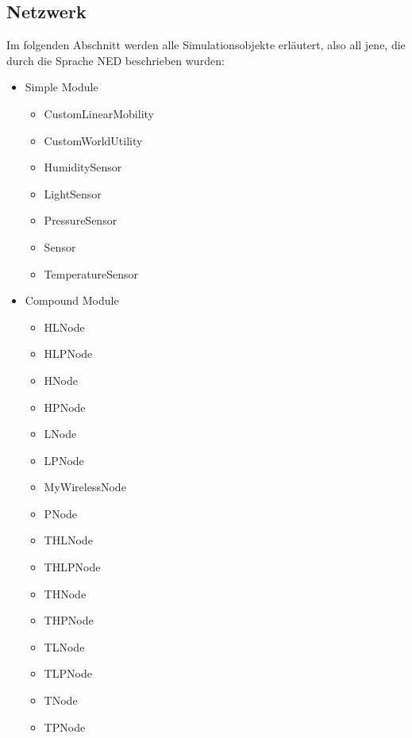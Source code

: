 \subsection{Netzwerk}

Im folgenden Abschnitt werden alle Simulationsobjekte erläutert, also all jene, die durch die Sprache NED beschrieben wurden:

\begin{itemize}{\label{enum:Netzwerk}}
\item Simple Module
\begin{multicols}{2}
\begin{itemize}
\item CustomLinearMobility
\item CustomWorldUtility  
\item HumiditySensor
\item LightSensor
\item PressureSensor
\item Sensor
\item TemperatureSensor 
\end{itemize}
\end{multicols}
\item Compound Module
\begin{multicols}{2}
\begin{itemize}
\item HLNode
\item HLPNode
\item HNode
\item HPNode
\item LNode
\item LPNode
\item MyWirelessNode
\item PNode
\item THLNode
\item THLPNode
\item THNode
\item THPNode
\item TLNode
\item TLPNode
\item TNode
\item TPNode 
\end{itemize}
\end{multicols}
\end{itemize}


